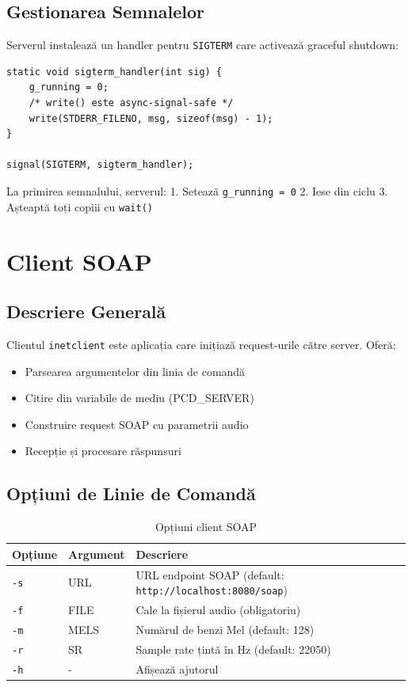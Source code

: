 \documentclass[12pt,a4paper,oneside]{book}
\begin{document}
\subsection{Gestionarea Semnalelor}

Serverul instalează un handler pentru \texttt{SIGTERM} care activează graceful shutdown:

\begin{lstlisting}
static void sigterm_handler(int sig) {
    g_running = 0;
    /* write() este async-signal-safe */
    write(STDERR_FILENO, msg, sizeof(msg) - 1);
}

signal(SIGTERM, sigterm_handler);
\end{lstlisting}

La primirea semnalului, serverul:
1. Setează \texttt{g\_running = 0}
2. Iese din ciclu
3. Așteaptă toți copiii cu \texttt{wait()}

\section{Client SOAP}

\subsection{Descriere Generală}

Clientul \texttt{inetclient} este aplicația care inițiază request-urile către server. Oferă:
\begin{itemize}
    \item Parsearea argumentelor din linia de comandă
    \item Citire din variabile de mediu (PCD\_SERVER)
    \item Construire request SOAP cu parametrii audio
    \item Recepție și procesare răspunsuri
\end{itemize}

\subsection{Opțiuni de Linie de Comandă}

\begin{table}[H]
\centering
\begin{tabularx}{\textwidth}{|l|l|X|}
\hline
\textbf{Opțiune} & \textbf{Argument} & \textbf{Descriere} \\
\hline
\texttt{-s} & URL & URL endpoint SOAP (default: \texttt{http://localhost:8080/soap}) \\
\hline
\texttt{-f} & FILE & Cale la fișierul audio (obligatoriu) \\
\hline
\texttt{-m} & MELS & Numărul de benzi Mel (default: 128) \\
\hline
\texttt{-r} & SR & Sample rate țintă în Hz (default: 22050) \\
\hline
\texttt{-h} & - & Afișează ajutorul \\
\hline
\end{tabularx}
\caption{Opțiuni client SOAP}
\end{table}
\end{document}
